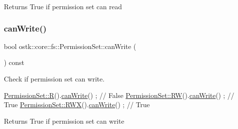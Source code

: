 \begin{DoxyReturn}{Returns}
True if permission set can read 
\end{DoxyReturn}
\mbox{\label{classostk_1_1core_1_1fs_1_1_permission_set_af6d8b2ae7ecd09cecf3a019247217abb}} 
\subsubsection{\texorpdfstring{can\+Write()}{canWrite()}}
{\footnotesize\ttfamily bool ostk\+::core\+::fs\+::\+Permission\+Set\+::can\+Write (\begin{DoxyParamCaption}{ }\end{DoxyParamCaption}) const}



Check if permission set can write. 


\begin{DoxyCode}
\hyperlink{classostk_1_1core_1_1fs_1_1_permission_set_a400f8be607966c0a42597f5cef062210}{PermissionSet::R}().\hyperlink{classostk_1_1core_1_1fs_1_1_permission_set_af6d8b2ae7ecd09cecf3a019247217abb}{canWrite}() ; \textcolor{comment}{// False}
\hyperlink{classostk_1_1core_1_1fs_1_1_permission_set_ad58bc0911ca89d3c03c089f1647d0315}{PermissionSet::RW}().\hyperlink{classostk_1_1core_1_1fs_1_1_permission_set_af6d8b2ae7ecd09cecf3a019247217abb}{canWrite}() ; \textcolor{comment}{// True}
\hyperlink{classostk_1_1core_1_1fs_1_1_permission_set_a9298592527e35edb785430f03e83e79f}{PermissionSet::RWX}().\hyperlink{classostk_1_1core_1_1fs_1_1_permission_set_af6d8b2ae7ecd09cecf3a019247217abb}{canWrite}() ; \textcolor{comment}{// True}
\end{DoxyCode}


\begin{DoxyReturn}{Returns}
True if permission set can write 
\end{DoxyReturn}
\mbox{\label{classostk_1_1core_1_1fs_1_1_permission_set_afde0c91f366451887bd3cde612f28045}} 
